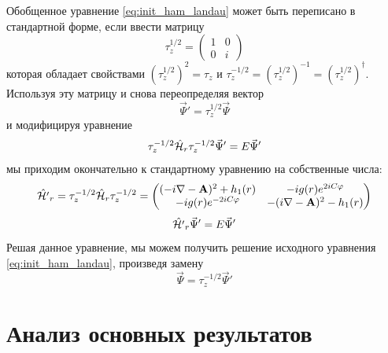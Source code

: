 \documentclass[a4paper,article,14pt]{extarticle}
\begin{document}
Обобщенное уравнение \eqref{eq:init_ham_landau} может быть переписано в стандартной форме, если ввести матрицу
$$
\tau_z^{1/2} = 
	\begin{pmatrix} 	
		1 &  0 \\
		0 &  i 
	\end{pmatrix}
$$
которая обладает свойствами $(\tau_z^{1/2})^2 = \tau_z$ и $\tau_z^{-1/2}=(\tau_z^{1/2})^{-1}=(\tau_z^{1/2})^\dagger$.
Используя эту матрицу и снова переопределяя вектор 
$$
\vec{\Psi}'=\tau_z^{1/2} \vec{\Psi}
$$
и модифицируя уравнение
$$
\tau_z^{-1/2} \hat {\cal H}_{r} \tau_z^{-1/2} \vec{\Psi}' = E \vec{\Psi}'
$$
мы приходим окончательно к стандартному уравнению на собственные числа:
$$
\hat {\cal H'}_{r} = \tau_z^{-1/2} \hat {\cal H}_{r} \tau_z^{-1/2} = \begin{pmatrix} 
(- i \nabla - \mathbf{A} ) ^ 2 + h_1 (r) &  -i g (r) e^{2 i C \varphi} \\  
-i g (r) e^{-2 i C \varphi}   & - ( i \nabla - \mathbf{A} ) ^ 2 - h_1 (r) 
\end{pmatrix}
$$
$$
\hat {\cal H'}_{r} \vec{\Psi}' = E \vec{\Psi}'
$$
Решая данное уравнение, мы можем получить решение исходного уравнения \eqref{eq:init_ham_landau}, произведя замену
$$
\vec{\Psi} = \tau_z^{-1/2} \vec{\Psi}'
$$


\pagebreak
\section{ Анализ основных результатов }


\end{document}
